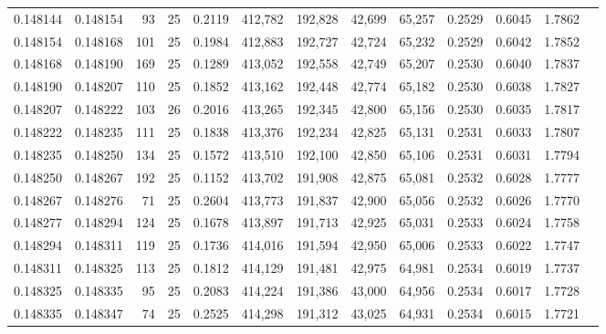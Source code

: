\begin{tabular}{rrrrrrrrrrrrr}
0.148144 & 0.148154 &    93 &  25 &                                     0.2119 & 412,782 & 192,828 &  42,699 &  65,257 & 0.2529 & 0.6045 & 1.7862 \\
0.148154 & 0.148168 &   101 &  25 &                                     0.1984 & 412,883 & 192,727 &  42,724 &  65,232 & 0.2529 & 0.6042 & 1.7852 \\
0.148168 & 0.148190 &   169 &  25 &                                     0.1289 & 413,052 & 192,558 &  42,749 &  65,207 & 0.2530 & 0.6040 & 1.7837 \\
0.148190 & 0.148207 &   110 &  25 &                                     0.1852 & 413,162 & 192,448 &  42,774 &  65,182 & 0.2530 & 0.6038 & 1.7827 \\
0.148207 & 0.148222 &   103 &  26 &                                     0.2016 & 413,265 & 192,345 &  42,800 &  65,156 & 0.2530 & 0.6035 & 1.7817 \\
0.148222 & 0.148235 &   111 &  25 &                                     0.1838 & 413,376 & 192,234 &  42,825 &  65,131 & 0.2531 & 0.6033 & 1.7807 \\
0.148235 & 0.148250 &   134 &  25 &                                     0.1572 & 413,510 & 192,100 &  42,850 &  65,106 & 0.2531 & 0.6031 & 1.7794 \\
0.148250 & 0.148267 &   192 &  25 &                                     0.1152 & 413,702 & 191,908 &  42,875 &  65,081 & 0.2532 & 0.6028 & 1.7777 \\
0.148267 & 0.148276 &    71 &  25 &                                     0.2604 & 413,773 & 191,837 &  42,900 &  65,056 & 0.2532 & 0.6026 & 1.7770 \\
0.148277 & 0.148294 &   124 &  25 &                                     0.1678 & 413,897 & 191,713 &  42,925 &  65,031 & 0.2533 & 0.6024 & 1.7758 \\
0.148294 & 0.148311 &   119 &  25 &                                     0.1736 & 414,016 & 191,594 &  42,950 &  65,006 & 0.2533 & 0.6022 & 1.7747 \\
0.148311 & 0.148325 &   113 &  25 &                                     0.1812 & 414,129 & 191,481 &  42,975 &  64,981 & 0.2534 & 0.6019 & 1.7737 \\
0.148325 & 0.148335 &    95 &  25 &                                     0.2083 & 414,224 & 191,386 &  43,000 &  64,956 & 0.2534 & 0.6017 & 1.7728 \\
0.148335 & 0.148347 &    74 &  25 &                                     0.2525 & 414,298 & 191,312 &  43,025 &  64,931 & 0.2534 & 0.6015 & 1.7721 \\

\end{tabular}

